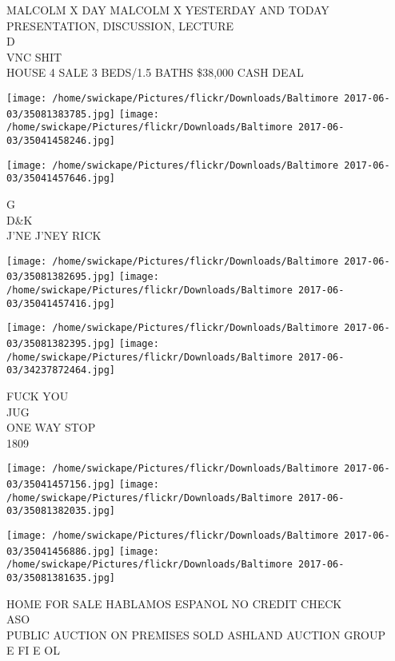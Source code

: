 \documentclass[10pt,letterpaper]{article}
\begin{document}
MALCOLM X DAY MALCOLM X YESTERDAY AND TODAY PRESENTATION, DISCUSSION, LECTURE\\
D\\
VNC SHIT\\
HOUSE 4 SALE 3 BEDS/1.5 BATHS \$38,000 CASH DEAL\\
\pagebreak

\texttt{[image: /home/swickape/Pictures/flickr/Downloads/Baltimore 2017-06-03/35081383785.jpg]}
\texttt{[image: /home/swickape/Pictures/flickr/Downloads/Baltimore 2017-06-03/35041458246.jpg]}

\vspace{0.25in}
\texttt{[image: /home/swickape/Pictures/flickr/Downloads/Baltimore 2017-06-03/35041457646.jpg]}

G\\
D\&K\\
J'NE J'NEY RICK\\
\pagebreak

\texttt{[image: /home/swickape/Pictures/flickr/Downloads/Baltimore 2017-06-03/35081382695.jpg]}
\texttt{[image: /home/swickape/Pictures/flickr/Downloads/Baltimore 2017-06-03/35041457416.jpg]}

\texttt{[image: /home/swickape/Pictures/flickr/Downloads/Baltimore 2017-06-03/35081382395.jpg]}
\texttt{[image: /home/swickape/Pictures/flickr/Downloads/Baltimore 2017-06-03/34237872464.jpg]}

FUCK YOU\\
JUG\\
ONE WAY STOP\\
1809\\
\pagebreak

\texttt{[image: /home/swickape/Pictures/flickr/Downloads/Baltimore 2017-06-03/35041457156.jpg]}
\texttt{[image: /home/swickape/Pictures/flickr/Downloads/Baltimore 2017-06-03/35081382035.jpg]}

\texttt{[image: /home/swickape/Pictures/flickr/Downloads/Baltimore 2017-06-03/35041456886.jpg]}
\texttt{[image: /home/swickape/Pictures/flickr/Downloads/Baltimore 2017-06-03/35081381635.jpg]}

HOME FOR SALE HABLAMOS ESPANOL NO CREDIT CHECK\\
ASO\\
PUBLIC AUCTION ON PREMISES SOLD ASHLAND AUCTION GROUP\\
E FI E OL\\
\pagebreak
\end{document}
